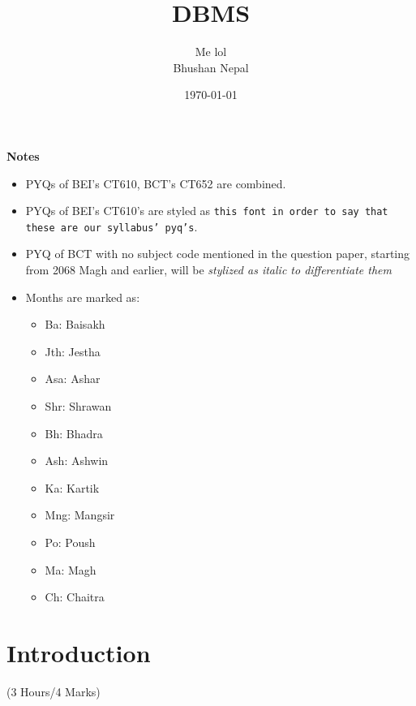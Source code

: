 \documentclass[12pt]{article}
\title{DBMS}
\author{Me lol\\Bhushan Nepal}
\date{\today}
\begin{document}
\maketitle
\vspace{10cm}
\begin{large}\textbf{Notes}\end{large}
\begin{itemize}
\item PYQs of BEI's CT610, BCT's CT652 are combined.
\item PYQs of BEI's CT610's are styled as \texttt{this font in order to say that these are our syllabus' pyq's}.
\item PYQ of BCT with no subject code mentioned in the question paper, starting from 2068 Magh and earlier, will be \textit{stylized as italic to differentiate them}
\item Months are marked as: 
\begin{itemize}[noitemsep]
	\item Ba: Baisakh
	\item Jth: Jestha
	\item Asa: Ashar
	\item Shr: Shrawan
	\item Bh: Bhadra
	\item Ash: Ashwin
	\item Ka: Kartik
	\item Mng: Mangsir
	\item Po: Poush
	\item Ma: Magh
	\item Ch: Chaitra
\end{itemize}
\end{itemize}

\pagebreak
\tableofcontents
\pagebreak

\section{Introduction}
    \begin{center}(3 Hours/4 Marks)\end{center}
\end{document}
